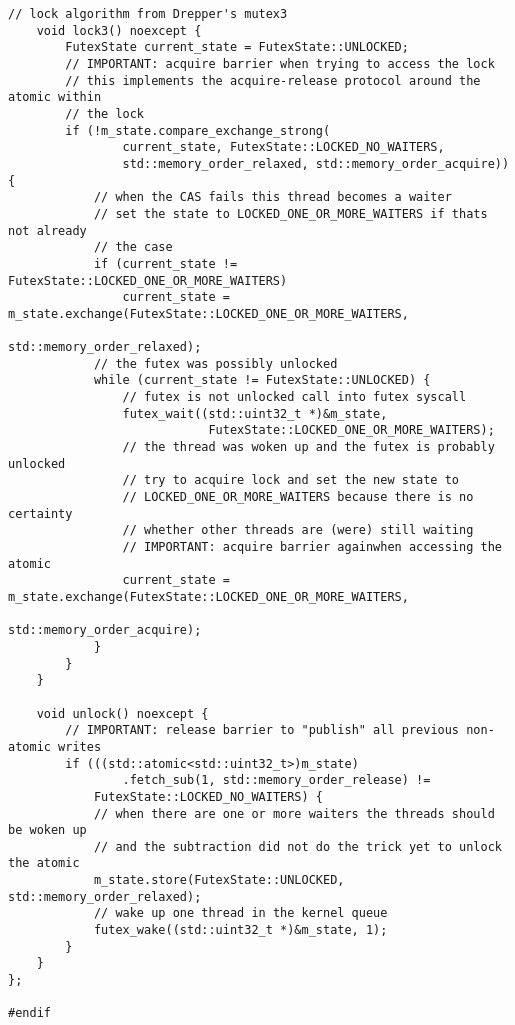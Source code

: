 \begin{lstlisting}[caption={Drepper's "mutex2/mutex3" in C++},label=append_futex]
    // lock algorithm from Drepper's mutex3
    void lock3() noexcept {
        FutexState current_state = FutexState::UNLOCKED;
        // IMPORTANT: acquire barrier when trying to access the lock
        // this implements the acquire-release protocol around the atomic within
        // the lock
        if (!m_state.compare_exchange_strong(
                current_state, FutexState::LOCKED_NO_WAITERS,
                std::memory_order_relaxed, std::memory_order_acquire)) {
            // when the CAS fails this thread becomes a waiter
            // set the state to LOCKED_ONE_OR_MORE_WAITERS if thats not already
            // the case
            if (current_state != FutexState::LOCKED_ONE_OR_MORE_WAITERS)
                current_state = m_state.exchange(FutexState::LOCKED_ONE_OR_MORE_WAITERS,
                                                    std::memory_order_relaxed);
            // the futex was possibly unlocked
            while (current_state != FutexState::UNLOCKED) {
                // futex is not unlocked call into futex syscall
                futex_wait((std::uint32_t *)&m_state,
                            FutexState::LOCKED_ONE_OR_MORE_WAITERS);
                // the thread was woken up and the futex is probably unlocked
                // try to acquire lock and set the new state to
                // LOCKED_ONE_OR_MORE_WAITERS because there is no certainty
                // whether other threads are (were) still waiting
                // IMPORTANT: acquire barrier againwhen accessing the atomic
                current_state = m_state.exchange(FutexState::LOCKED_ONE_OR_MORE_WAITERS,
                                                    std::memory_order_acquire);
            }
        }
    }

    void unlock() noexcept {
        // IMPORTANT: release barrier to "publish" all previous non-atomic writes
        if (((std::atomic<std::uint32_t>)m_state)
                .fetch_sub(1, std::memory_order_release) !=
            FutexState::LOCKED_NO_WAITERS) {
            // when there are one or more waiters the threads should be woken up
            // and the subtraction did not do the trick yet to unlock the atomic
            m_state.store(FutexState::UNLOCKED, std::memory_order_relaxed);
            // wake up one thread in the kernel queue
            futex_wake((std::uint32_t *)&m_state, 1);
        }
    }
};

#endif
\end{lstlisting}